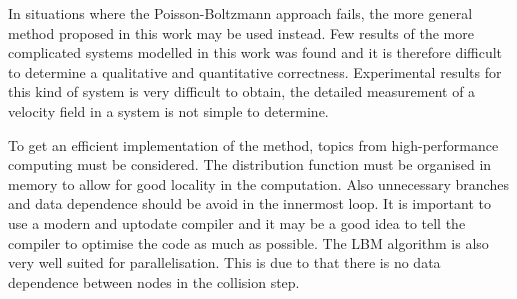 In situations where the Poisson-Boltzmann approach fails, the more
general method proposed in this work may be used instead. Few results
of the more complicated systems modelled in this work was found and it
is therefore difficult to determine a qualitative and quantitative
correctness. Experimental results for this kind of system is very
difficult to obtain, the detailed measurement of a velocity
field in a system is not simple to determine. 

To get an efficient implementation of the method, topics from
high-performance computing must be considered. The distribution
function must be organised in memory to allow for good locality in the
computation. Also unnecessary branches and data dependence should be
avoid in the innermost loop. It is important to use a modern and
uptodate compiler and it may be a good idea to tell the compiler to
optimise the code as much as possible. The LBM algorithm is also very
well suited for parallelisation. This is due to that there is no data
dependence between nodes in the collision step.
